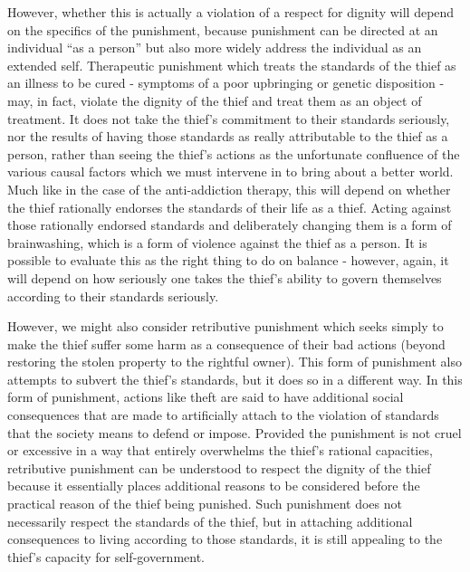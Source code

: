 \documentclass[phd,12pt,oneside,paper=letterpaper]{ubcthesis}
\begin{document}
However, whether this is actually a violation of a respect for dignity will depend on the specifics of the punishment, because punishment can be directed at an individual ``as a person'' but also more widely address the individual as an extended self. Therapeutic punishment which treats the standards of the thief as an illness to be cured - symptoms of a poor upbringing or genetic disposition - may, in fact, violate the dignity of the thief and treat them as an object of treatment. It does not take the thief's commitment to their standards seriously, nor the results of having those standards as really attributable to the thief as a person, rather than seeing the thief's actions as the unfortunate confluence of the various causal factors which we must intervene in to bring about a better world. Much like in the case of the anti-addiction therapy, this will depend on whether the thief rationally endorses the standards of their life as a thief. Acting against those rationally endorsed standards and deliberately changing them is a form of brainwashing, which is a form of violence against the thief as a person. It is possible to evaluate this as the right thing to do on balance - however, again, it will depend on how seriously one takes the thief's ability to govern themselves according to their standards seriously.

However, we might also consider retributive punishment which seeks simply to make the thief suffer some harm as a consequence of their bad actions (beyond restoring the stolen property to the rightful owner). This form of punishment also attempts to subvert the thief's standards, but it does so in a different way. In this form of punishment, actions like theft are said to have additional social consequences that are made to artificially attach to the violation of standards that the society means to defend or impose. Provided the punishment is not cruel or excessive in a way that entirely overwhelms the thief's rational capacities, retributive punishment can be understood to respect the dignity of the thief because it essentially places additional reasons to be considered before the practical reason of the thief being punished. Such punishment does not necessarily respect the standards of the thief, but in attaching additional consequences to living according to those standards, it is still appealing to the thief's capacity for self-government.
\end{document}
